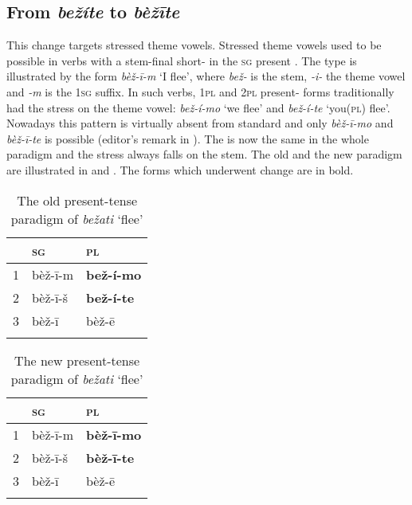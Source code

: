 \documentclass[output=paper,nonflat,colorlinks,citecolor=brown,newtxmath]{langsci/langscibook}
\begin{document}
\subsection{From \textit{bežíte} to \textit{bèžīte}} \label{sec:kager:subsec22}
This change targets stressed theme vowels. Stressed theme vowels used to be possible in verbs with a stem-final short- in the \textsc{sg}  present . The type is illustrated by the form \textit{bèž-ī-m} `I flee', where \textit{bež-} is the stem, \textit{-i-} the theme vowel and \textit{-m} is the 1\textsc{sg} suffix. In such verbs, 1\textsc{pl} and 2\textsc{pl} present- forms traditionally had the stress on the theme vowel: \textit{bež-í-mo} `we flee' and \textit{bež-í-te} `you(\textsc{pl}) flee'. Nowadays this pattern is virtually absent from standard  and only \textit{bèž-ī-mo} and \textit{bèž-ī-te} is possible (editor's remark in \citealt[379]{Klaic2013}). The  is now the same in the whole paradigm and the stress always falls on the stem. The old and the new paradigm are illustrated in  and .  The forms which underwent change are in bold.

\begin{table}
\caption{The old present-tense paradigm of \textit{bežati} `flee'}
\label{tab:kager:2}
 \begin{tabular}{  l l l }
  \lsptoprule
& \textsc{sg} & \textsc{pl}\\
  \midrule
  1  &   bèž-ī-m  &   \textbf{bež-í-mo}\\
  2  &  bèž-ī-š & \textbf{bež-í-te}\\
3  &  bèž-ī & bèž-ē\\
  \lspbottomrule
 \end{tabular}
\end{table}


\begin{table}
\caption{The new present-tense paradigm of \textit{bežati} `flee'}
\label{tab:kager:3}
 \begin{tabular}{  l l l }
  \lsptoprule
& \textsc{sg} & \textsc{pl}\\
  \midrule
  1  &   bèž-ī-m  &   \textbf{bèž-ī-mo}\\
  2  &  bèž-ī-š & \textbf{bèž-ī-te}\\
3  &  bèž-ī & bèž-ē\\
  \lspbottomrule
 \end{tabular}
\end{table}
\end{document}
